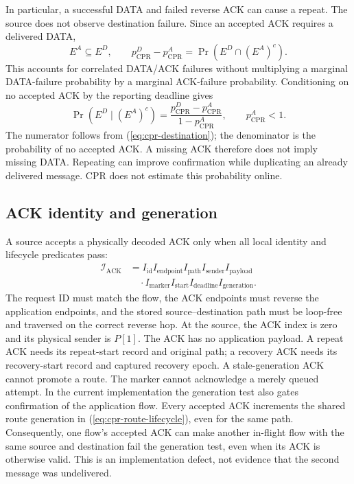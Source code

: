 \documentclass[conference,letterpaper,10pt]{IEEEtran}
\begin{document}
In particular, a successful DATA and failed reverse ACK can cause a repeat.
The source does not observe destination failure. Since an accepted ACK
requires a delivered DATA,
\begin{equation}
E^A\subseteq E^D,\qquad
p_{\mathrm{CPR}}^D-p_{\mathrm{CPR}}^A
 =\Pr(E^D\cap(E^A)^c).
\label{eq:cpr-destination}
\end{equation}
This accounts for correlated DATA/ACK failures without multiplying a
marginal DATA-failure probability by a marginal ACK-failure probability.
Conditioning on no accepted ACK by the reporting deadline gives
\begin{equation}
\Pr(E^D\mid(E^A)^c)
 =\frac{p_{\mathrm{CPR}}^D-p_{\mathrm{CPR}}^A}
        {1-p_{\mathrm{CPR}}^A},\qquad p_{\mathrm{CPR}}^A<1.
\label{eq:unconfirmed-delivery}
\end{equation}
The numerator follows from (\ref{eq:cpr-destination}); the denominator is
the probability of no accepted ACK. A missing ACK therefore does not imply
missing DATA. Repeating can improve confirmation while duplicating an
already delivered message. CPR does not estimate this probability online.

\subsection{ACK identity and generation}
A source accepts a physically decoded ACK only when all local identity
and lifecycle predicates pass:
\begin{equation}
\begin{aligned}
\mathcal I_{\mathrm{ACK}}
 &=I_{\mathrm{id}}I_{\mathrm{endpoint}}I_{\mathrm{path}}
   I_{\mathrm{sender}}I_{\mathrm{payload}}\\
 &\quad\cdot I_{\mathrm{marker}}I_{\mathrm{start}}
       I_{\mathrm{deadline}}I_{\mathrm{generation}}.
\end{aligned}
\label{eq:ack-identity}
\end{equation}
The request ID must match the flow, the ACK endpoints must reverse the
application endpoints, and the stored source--destination path must be
loop-free and traversed on the correct reverse hop.
At the source, the ACK index is zero and its physical sender is $P[1]$.
The ACK has no application payload. A repeat ACK needs its repeat-start
record and original path; a recovery ACK needs its recovery-start record
and captured recovery epoch. A stale-generation ACK cannot promote a route.
The marker cannot acknowledge a merely queued attempt.
In the current implementation the generation test also gates confirmation
of the application flow. Every accepted ACK increments the shared route
generation in (\ref{eq:cpr-route-lifecycle}), even for the same path.
Consequently, one flow's accepted ACK can make another in-flight flow
with the same source and destination fail the generation test, even when
its ACK is otherwise valid. This is an implementation
defect, not evidence that the second message was undelivered.
\end{document}
